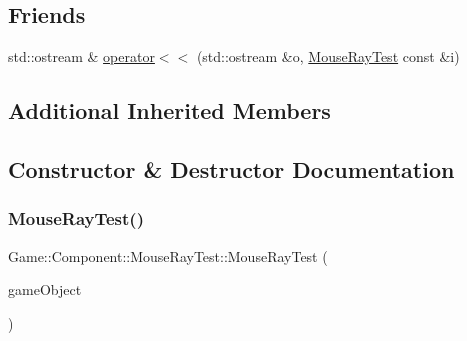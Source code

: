 \subsection*{Friends}
\begin{DoxyCompactItemize}
\item 
std\+::ostream \& \mbox{\hyperlink{class_game_1_1_component_1_1_mouse_ray_test_a779a38a659ea997f8f091bc720620380}{operator$<$$<$}} (std\+::ostream \&o, \mbox{\hyperlink{class_game_1_1_component_1_1_mouse_ray_test}{Mouse\+Ray\+Test}} const \&i)
\end{DoxyCompactItemize}
\subsection*{Additional Inherited Members}


\subsection{Constructor \& Destructor Documentation}
\mbox{\label{class_game_1_1_component_1_1_mouse_ray_test_a99877b8b30c5523e5ccd69998fcbf866}} 
\subsubsection{\texorpdfstring{Mouse\+Ray\+Test()}{MouseRayTest()}}
{\footnotesize\ttfamily Game\+::\+Component\+::\+Mouse\+Ray\+Test\+::\+Mouse\+Ray\+Test (\begin{DoxyParamCaption}\item[{\mbox{\hyperlink{class_beer_engine_1_1_game_object}{Beer\+Engine\+::\+Game\+Object}} $\ast$}]{game\+Object }\end{DoxyParamCaption})}

\mbox{\label{class_game_1_1_component_1_1_mouse_ray_test_ad20ea199276f520e5d18adf17cea8293}} 
